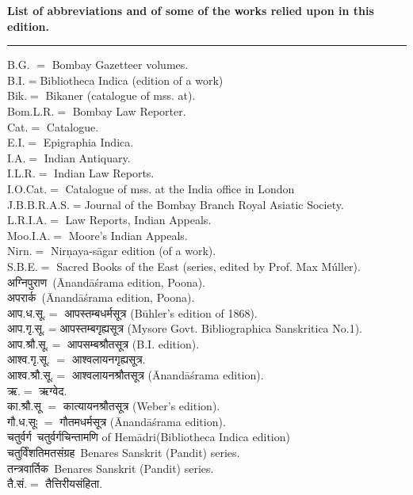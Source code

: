 \documentclass[11pt, openany]{book}
\begin{document}
\newpage
\thispagestyle{empty}
\begin{center}
\textbf{\Large List of abbreviations and of some of the works relied upon in this edition.}\\

\rule{0.4\linewidth}{0.5pt}
\end{center}

\vspace{-6mm}
\noindent
{\small B.G. $=$ Bombay Gazetteer volumes.\\
B.I.$=$Bibliotheca Indica (edition of a work)\\
Bik.$=$ Bikaner (catalogue of mss. at).\\
Bom.L.R.$=$ Bombay Law Reporter.\\
Cat.$=$ Catalogue. \\
E.I.$=$ Epigraphia Indica.\\
I.A.$=$ Indian Antiquary.\\
I.L.R.$=$ Indian Law Reports.\\
I.O.Cat.$=$ Catalogue of mss. at the India office in London\\
J.B.B.R.A.S.$=$Journal of the Bombay Branch Royal Asiatic Society.\\
L.R.I.A.$=$ Law Reports, Indian Appeals.\\
Moo.I.A.$=$ Moore's Indian Appeals.\\
Nirn.$=$ Nirṇaya-sāgar edition (of a work).\\
S.B.E.$=$ Sacred Books of the East (series, edited by Prof. Max Múller).\\
अग्निपुराण\textendash\ (Ānandāśrama edition, Poona).\\
अपरार्क\textendash\ (Ānandāśrama edition, Poona).\\
आप.ध.सू.$=$ आपस्तम्बधर्मसूत्र (Būhler's edition of 1868).\\
आप.गृ.सू.$=$आपस्तम्बगृह्यसूत्र (Mysore Govt. Bibliographica Sanskritica No.1).\\
आप.श्रौ.सू.$=$ आपसम्बश्रौतसूत्र (B.I. edition).\\
आश्व.गृ.सू. $=$ आश्वलायनगृह्यसूत्र.\\
आश्व.श्रौ.सू.$=$ आश्वलायनश्रौतसूत्र (Ānandāśrama edition).\\
ऋ.$=$ ऋग्वेद.\\
का.श्रौ.सू $=$ कात्यायनश्रौतसूत्र (Weber's edition).\\
गौ.ध.सूः $=$ गौतमधर्मसूत्र (Ānandāśrama edition).\\
चतुर्वर्ग\textendash\ चतुर्वर्गचिन्तामणि of Hemādri(Bibliotheca Indica edition)\\
चतुर्विंशतिमतसंग्रह\textendash\ Benares Sanskrit (Pandit) series.\\
तन्त्रवार्तिक\textendash\ Benares Sanskrit (Pandit) series.\\
तै.सं.$=$ तैत्तिरीयसंहिता.}
\end{document}
